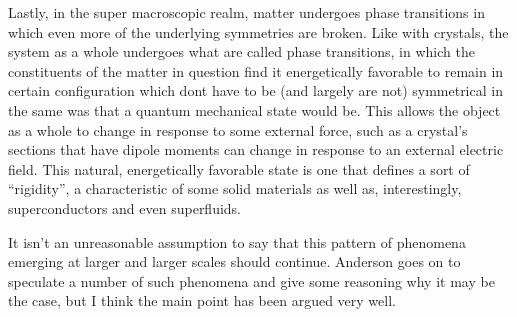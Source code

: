 Lastly, in the super macroscopic realm, matter undergoes phase transitions in which even more of the underlying symmetries are broken. Like with crystals, the system as a whole undergoes what are called phase transitions, in which the constituents of the matter in question find it energetically favorable to remain in certain configuration which dont have to be (and largely are not) symmetrical in the same was that a quantum mechanical state would be. This allows the object as a whole to change in response to some external force, such as a crystal's sections that have dipole moments can change in response to an external electric field. This natural, energetically favorable state is one that defines a sort of ``rigidity'', a characteristic of some solid materials as well as, interestingly, superconductors and even superfluids.

It isn't an unreasonable assumption to say that this pattern of phenomena emerging at larger and larger scales should continue. Anderson goes on to speculate a number of such phenomena and give some reasoning why it may be the case, but I think the main point has been argued very well.





